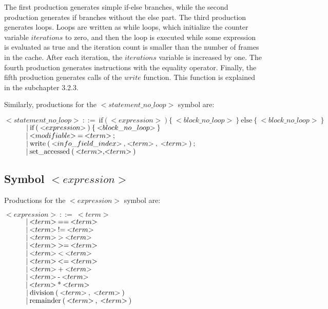 The first production generates simple if-else branches, while the second production generates if branches without the else part. The third production generates loops. Loops are written as while loops, which initialize the counter variable $iterations$ to zero, and then the loop is executed while some expression is evaluated as true and the iteration count is smaller than the number of frames in the cache. After each iteration, the $iterations$ variable is increased by one. The fourth production generates instructions with the equality operator. Finally, the fifth production generates calls of the $write$ function. This function is explained in the subchapter 3.2.3.

Similarly, productions for the ${<}statement\_no\_loop{>}$ symbol are:

\noindent
$ {<}statement\_no\_loop{>}\:::=\:\text{if}\:\text{(}\:{<}expression{>}\:\text{)}\:\text{\{}\:{<}block\_no\_loop{>}\:\text{\}}\:\text{else}\:\text{\{}\:{<}block\_no\_loop{>}\:\text{\}} $\\
$ \indent\indent |\:\text{if}\:\text{(}\:{<}expression{>}\:\text{)}\:\text{\{}\:{<}block\_no\_loop{>}\:\text{\}}$\\
$ \indent\indent |\:{<}modifiable{>}\:\text{=}\:{<}term{>}\:\text{;} $\\
$ \indent\indent |\:\text{write}\:\text{(}\:{<}info\_field\_index{>}\:\text{,}\:{<}term{>}\:\text{,}\:\:{<}term{>}\:\text{)}\:\text{;} $\\
$ \indent\indent |\:\text{set\_accessed}\:\text{(}\:{<}term{>}\text{,}{<}term{>}\:\text{)}$

\subsection{Symbol ${<}expression{>}$}
Productions for the ${<}expression{>}$ symbol are:

\noindent
$ {<}expression{>}\:::=\:{<}term{>} $\\
$ \indent\indent |\:{<}term{>}\:\text{==}\:{<}term{>} $\\
$ \indent\indent |\:{<}term{>}\:\text{!=}\:{<}term{>} $\\
$ \indent\indent |\:{<}term{>}\:\text{>}\:{<}term{>} $\\
$ \indent\indent |\:{<}term{>}\:\text{>=}\:{<}term{>} $\\
$ \indent\indent |\:{<}term{>}\:\text{<}\:{<}term{>} $\\
$ \indent\indent |\:{<}term{>}\:\text{<=}\:{<}term{>} $\\
$ \indent\indent |\:{<}term{>}\:\text{+}\:{<}term{>} $\\
$ \indent\indent |\:{<}term{>}\:\text{-}\:{<}term{>} $\\
$ \indent\indent |\:{<}term{>}\:\text{*}\:{<}term{>} $\\
$ \indent\indent |\:\text{division}\:\text{(}\:{<}term{>}\:\text{,}\:\:{<}term{>}\:\text{)} $\\
$ \indent\indent |\:\text{remainder}\:\text{(}\:{<}term{>}\:\text{,}\:\:{<}term{>}\:\text{)} $

